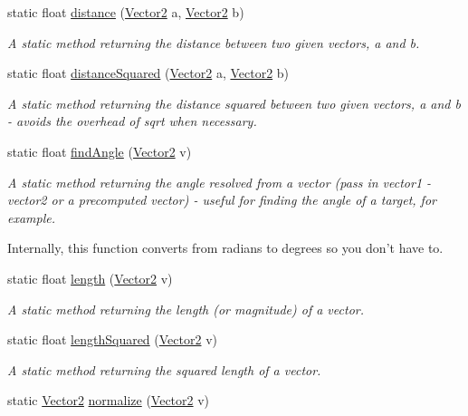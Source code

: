 \begin{DoxyCompactItemize}
static float \hyperlink{classsteer_1_1_vector_math_a386d5cc8c572422ac7a2f63925883a06}{distance} (\hyperlink{structsteer_1_1_vector2}{Vector2} a, \hyperlink{structsteer_1_1_vector2}{Vector2} b)
\begin{DoxyCompactList}\small\item\em A static method returning the distance between two given vectors, a and b. \end{DoxyCompactList}\item 
static float \hyperlink{classsteer_1_1_vector_math_ab7c1336121423d029113b0314b48dc15}{distance\-Squared} (\hyperlink{structsteer_1_1_vector2}{Vector2} a, \hyperlink{structsteer_1_1_vector2}{Vector2} b)
\begin{DoxyCompactList}\small\item\em A static method returning the distance squared between two given vectors, a and b -\/ avoids the overhead of sqrt when necessary. \end{DoxyCompactList}\item 
static float \hyperlink{classsteer_1_1_vector_math_acd9482d3b672a34ddf90e20e94373bd5}{find\-Angle} (\hyperlink{structsteer_1_1_vector2}{Vector2} v)
\begin{DoxyCompactList}\small\item\em A static method returning the angle resolved from a vector (pass in vector1 -\/ vector2 or a precomputed vector) -\/ useful for finding the angle of a target, for example.\par
Internally, this function converts from radians to degrees so you don't have to. \end{DoxyCompactList}\item 
static float \hyperlink{classsteer_1_1_vector_math_a71fff49a5e48b59400a331283aa89adc}{length} (\hyperlink{structsteer_1_1_vector2}{Vector2} v)
\begin{DoxyCompactList}\small\item\em A static method returning the length (or magnitude) of a vector. \end{DoxyCompactList}\item 
static float \hyperlink{classsteer_1_1_vector_math_a70ef679a6a5e8ffeeaf8e37aa6510f65}{length\-Squared} (\hyperlink{structsteer_1_1_vector2}{Vector2} v)
\begin{DoxyCompactList}\small\item\em A static method returning the squared length of a vector. \end{DoxyCompactList}\item 
static \hyperlink{structsteer_1_1_vector2}{Vector2} \hyperlink{classsteer_1_1_vector_math_aae0d6aa81adba0a66ad40a43f71db6a3}{normalize} (\hyperlink{structsteer_1_1_vector2}{Vector2} v)

\end{DoxyCompactItemize}
